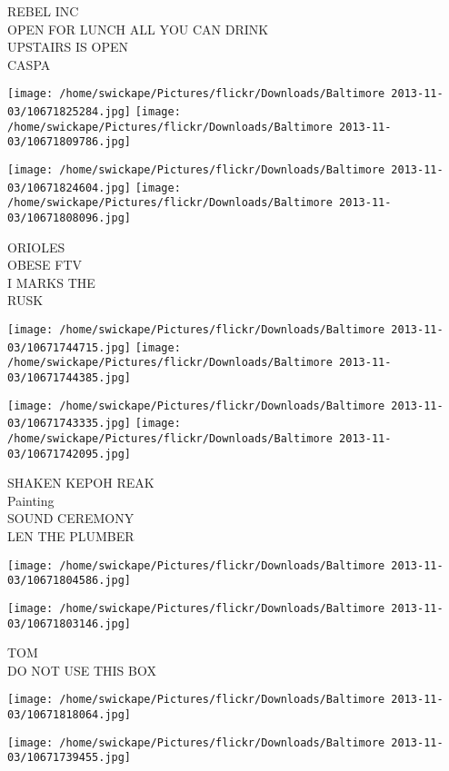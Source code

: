 \documentclass[10pt,letterpaper]{article}
\begin{document}
REBEL INC\\
OPEN FOR LUNCH ALL YOU CAN DRINK\\
UPSTAIRS IS OPEN\\
CASPA
\pagebreak

\texttt{[image: /home/swickape/Pictures/flickr/Downloads/Baltimore 2013-11-03/10671825284.jpg]}
\texttt{[image: /home/swickape/Pictures/flickr/Downloads/Baltimore 2013-11-03/10671809786.jpg]}

\texttt{[image: /home/swickape/Pictures/flickr/Downloads/Baltimore 2013-11-03/10671824604.jpg]}
\texttt{[image: /home/swickape/Pictures/flickr/Downloads/Baltimore 2013-11-03/10671808096.jpg]}

ORIOLES\\
OBESE FTV\\
I MARKS THE\\
RUSK
\pagebreak

\texttt{[image: /home/swickape/Pictures/flickr/Downloads/Baltimore 2013-11-03/10671744715.jpg]}
\texttt{[image: /home/swickape/Pictures/flickr/Downloads/Baltimore 2013-11-03/10671744385.jpg]}

\texttt{[image: /home/swickape/Pictures/flickr/Downloads/Baltimore 2013-11-03/10671743335.jpg]}
\texttt{[image: /home/swickape/Pictures/flickr/Downloads/Baltimore 2013-11-03/10671742095.jpg]}

SHAKEN KEPOH REAK\\
Painting\\
SOUND CEREMONY\\
LEN THE PLUMBER
\pagebreak

\texttt{[image: /home/swickape/Pictures/flickr/Downloads/Baltimore 2013-11-03/10671804586.jpg]}

\vspace{0.25in}
\texttt{[image: /home/swickape/Pictures/flickr/Downloads/Baltimore 2013-11-03/10671803146.jpg]}

TOM\\
DO NOT USE THIS BOX
\pagebreak

\texttt{[image: /home/swickape/Pictures/flickr/Downloads/Baltimore 2013-11-03/10671818064.jpg]}

\vspace{0.25in}
\texttt{[image: /home/swickape/Pictures/flickr/Downloads/Baltimore 2013-11-03/10671739455.jpg]}
\end{document}
